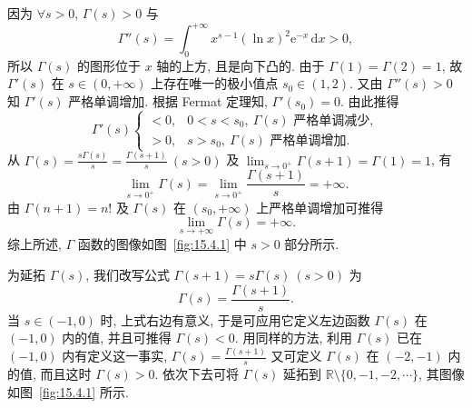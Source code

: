 \begin{example}\label{ex:15.4.8}
因为 $\forall s>0$, $\Gamma(s)>0$ 与
\[
  \Gamma''(s)=\int_{0}^{+\infty}x^{s-1}(\ln x)^{2}\mathrm{e}^{-x}\,\mathrm{d}x>0,
\]
所以 $\Gamma(s)$ 的图形位于 $x$ 轴的上方, 且是向下凸的. 由于 $\Gamma(1)=\Gamma(2)=1$, 故 $\Gamma'(s)$ 在 $s\in(0,+\infty)$ 上存在唯一的极小值点 $s_{0}\in(1,2)$. 又由 $\Gamma''(s)>0$ 知 $\Gamma'(s)$ 严格单调增加. 根据 Fermat 定理知, $\Gamma'(s_{0})=0$. 由此推得
\[
  \Gamma'(s)
  \begin{cases}
    <0, & 0<s<s_{0},\ \Gamma(s)\text{ 严格单调减少},\\
    >0, & s>s_{0},\ \Gamma(s)\text{ 严格单调增加}.
\end{cases}
\]
从 $\Gamma(s)=\frac{s\Gamma(s)}{s}=\frac{\Gamma(s+1)}{s}\ (s>0)$ 及 $\lim_{s\to 0^{+}}\Gamma(s+1)=\Gamma(1)=1$, 有
\[
  \lim_{s\to 0^{+}}\Gamma(s)=\lim_{s\to 0^{+}}\frac{\Gamma(s+1)}{s}=+\infty.
\]
由 $\Gamma(n+1)=n!$ 及 $\Gamma(s)$ 在 $(s_{0},+\infty)$ 上严格单调增加可推得
\[
  \lim_{s\to+\infty}\Gamma(s)=+\infty.
\]
综上所述, $\Gamma$ 函数的图像如图~\ref{fig:15.4.1} 中 $s>0$ 部分所示.

为延拓 $\Gamma(s)$, 我们改写公式 $\Gamma(s+1)=s\Gamma(s)\ (s>0)$ 为
\[
  \Gamma(s)=\frac{\Gamma(s+1)}{s}.
\]
当 $s\in(-1,0)$ 时, 上式右边有意义, 于是可应用它定义左边函数 $\Gamma(s)$ 在 $(-1,0)$ 内的值, 并且可推得 $\Gamma(s)<0$. 用同样的方法, 利用 $\Gamma(s)$ 已在 $(-1,0)$ 内有定义这一事实, $\Gamma(s)=\frac{\Gamma(s+1)}{s}$ 又可定义 $\Gamma(s)$ 在 $(-2,-1)$ 内的值, 而且这时 $\Gamma(s)>0$. 依次下去可将 $\Gamma(s)$ 延拓到 $\mathbb{R}\setminus\{0,-1,-2,\cdots\}$, 其图像如图~\ref{fig:15.4.1} 所示.
\end{example}

